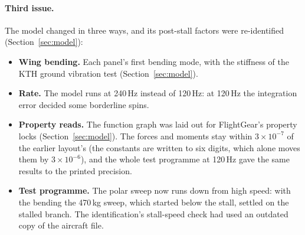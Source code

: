 \documentclass[10pt,a4paper,twocolumn]{article}
\begin{document}
\paragraph{Third issue.} The model changed in three ways, and its post-stall factors were re-identified (Section~\ref{sec:model}):
\begin{itemize}
\item \textbf{Wing bending.} Each panel's first bending mode, with the stiffness of the KTH ground vibration test (Section~\ref{sec:model}).
\item \textbf{Rate.} The model runs at 240\,Hz instead of 120\,Hz: at 120\,Hz the integration error decided some borderline spins.
\item \textbf{Property reads.} The function graph was laid out for FlightGear's property locks (Section~\ref{sec:model}). The forces and
moments stay within $3\times10^{-7}$ of the earlier layout's (the constants are written to six digits, which alone moves them by
$3\times10^{-6}$), and the whole test programme at 120\,Hz gave the same results to the printed precision.
\item \textbf{Test programme.} The polar sweep now runs down from high speed: with the bending the 470\,kg sweep, which started below
the stall, settled on the stalled branch. The identification's stall-speed check had used an outdated copy of the aircraft file.
\end{itemize}
\end{document}
